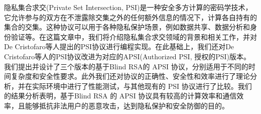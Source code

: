 隐私集合求交(Private Set Intersection, PSI)是一种安全多方计算的密码学技术，它允许参与的双方在不泄露除交集之外的任何额外信息的情况下，计算各自持有的集合的交集。这种协议可以用于各种隐私保护场景，例如数据共享、数据分析和身份验证等。在这篇文章中，我们将介绍隐私集合求交领域的背景和相关工作，并对De Cristofaro等人提出的PSI协议进行编程实现。在此基础上，我们还对De Cristofaro等人的PSI协议改进为对应的APSI(Authorized PSI, 授权的PSI)版本。我们提出并设计了三个版本的基于Blind RSA的 APSI 协议，分别适用于不同的时间复杂度和安全性要求。此外我们还对协议的正确性、安全性和效率进行了理论分析，并在实际环境中进行了性能测试，与其他现有的 PSI 协议进行了比较。我们的结果分析表明，基于Blind RSA 的 APSI 协议具有较高的计算效率和通信效率，且能够抵抗非法用户的恶意攻击，达到隐私保护和安全防御的目的。